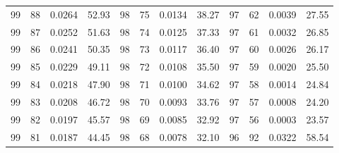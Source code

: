 \begin{tabular}{llll|llll|llll}
99 & 88 & 0.0264 & 52.93 & 98 & 75 & 0.0134 & 38.27 & 97 & 62 & 0.0039 & 27.55\\
99 & 87 & 0.0252 & 51.63 & 98 & 74 & 0.0125 & 37.33 & 97 & 61 & 0.0032 & 26.85\\
99 & 86 & 0.0241 & 50.35 & 98 & 73 & 0.0117 & 36.40 & 97 & 60 & 0.0026 & 26.17\\
99 & 85 & 0.0229 & 49.11 & 98 & 72 & 0.0108 & 35.50 & 97 & 59 & 0.0020 & 25.50\\
99 & 84 & 0.0218 & 47.90 & 98 & 71 & 0.0100 & 34.62 & 97 & 58 & 0.0014 & 24.84\\
99 & 83 & 0.0208 & 46.72 & 98 & 70 & 0.0093 & 33.76 & 97 & 57 & 0.0008 & 24.20\\
99 & 82 & 0.0197 & 45.57 & 98 & 69 & 0.0085 & 32.92 & 97 & 56 & 0.0003 & 23.57\\
99 & 81 & 0.0187 & 44.45 & 98 & 68 & 0.0078 & 32.10 & 96 & 92 & 0.0322 & 58.54\\
\bottomrule
\end{tabular}
\newpage
